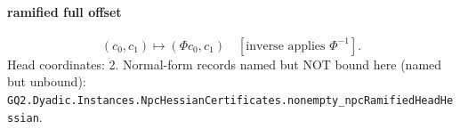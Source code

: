 \paragraph{ramified full offset}
\[(c_0,c_1)\mapsto(\Phi c_0,c_1)\quad[\text{inverse applies }\Phi^{-1}].\]
Head coordinates: 2. Normal-form records named but NOT bound here (named but unbound): \texttt{GQ2.Dyadic.Instances.NpcHessianCertificates.nonempty\_npcRamifiedHeadHessian}.
